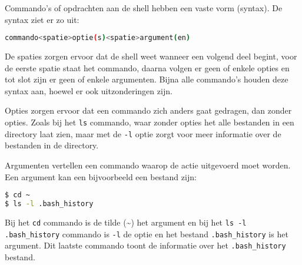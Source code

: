Commando's of opdrachten aan de shell hebben een vaste vorm (syntax). De syntax ziet er zo uit:

\begin{lstlisting}[language=bash]
commando<spatie>optie(s)<spatie>argument(en)
\end{lstlisting}

De spaties zorgen ervoor dat de shell weet wanneer een volgend deel begint, voor de eerste spatie staat het commando, daarna volgen er geen of enkele opties en tot slot zijn er geen of enkele argumenten. Bijna alle commando's houden deze syntax aan, hoewel er ook uitzonderingen zijn.

Opties zorgen ervoor dat een commando zich anders gaat gedragen, dan zonder opties. Zoals bij het \texttt{ls} commando, waar zonder opties het alle bestanden in een directory laat zien, maar met de \texttt{-l} optie zorgt voor meer informatie over de bestanden in de directory.

Argumenten vertellen een commando waarop de actie uitgevoerd moet worden. Een argument kan een bijvoorbeeld een bestand zijn:
\begin{lstlisting}[language=bash]
$ cd ~
$ ls -l .bash_history
\end{lstlisting}
Bij het \texttt{cd} commando is de tilde (\textasciitilde) het argument en bij het \texttt{ls -l .bash\_history} commando is \texttt{-l} de optie en het bestand \texttt{.bash\_history} is het argument. Dit laatste commando toont de informatie over het \texttt{.bash\_history} bestand.
